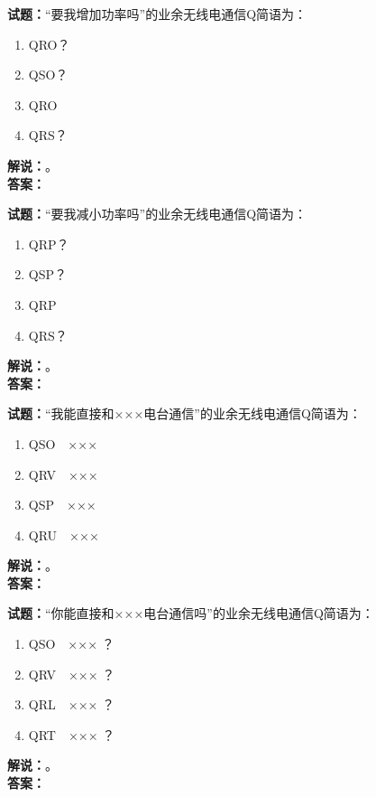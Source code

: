 \documentclass{ctexbook}
\begin{document}
\bigskip




\noindent\textbf{试题：}“要我增加功率吗”的业余无线电通信Q简语为：
\begin{enumerate}[leftmargin=3em]
\item QRO？
\item QSO？
\item QRO
\item QRS？
\end{enumerate}
\noindent\textbf{解说：}\textbf{}。\\\noindent\textbf{答案：}

\bigskip




\noindent\textbf{试题：}“要我减小功率吗”的业余无线电通信Q简语为：
\begin{enumerate}[leftmargin=3em]
\item QRP？
\item QSP？
\item QRP
\item QRS？
\end{enumerate}
\noindent\textbf{解说：}\textbf{}。\\\noindent\textbf{答案：}

\bigskip




\noindent\textbf{试题：}“我能直接和×××电台通信”的业余无线电通信Q简语为：
\begin{enumerate}[leftmargin=3em]
\item QSO　×××
\item QRV　×××
\item QSP　×××
\item QRU　×××
\end{enumerate}
\noindent\textbf{解说：}\textbf{}。\\\noindent\textbf{答案：}

\bigskip




\noindent\textbf{试题：}“你能直接和×××电台通信吗”的业余无线电通信Q简语为：
\begin{enumerate}[leftmargin=3em]
\item QSO　××× ？
\item QRV　××× ？
\item QRL　××× ？
\item QRT　××× ？
\end{enumerate}
\noindent\textbf{解说：}\textbf{}。\\\noindent\textbf{答案：}
\end{document}
